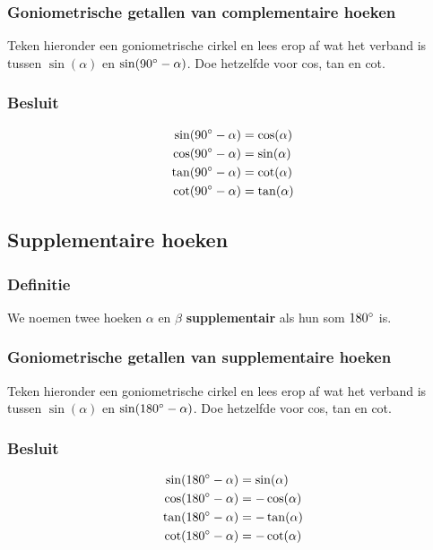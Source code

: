 \documentclass[a4paper,12pt]{article}
\begin{document}
\subsubsection*{Goniometrische getallen van complementaire hoeken}
Teken hieronder een goniometrische cirkel en lees erop af wat het verband is tussen $\sin(\alpha)$ en $\sin(90^\circ-\alpha)$. Doe hetzelfde voor cos, tan en cot.
\vspace*{7cm}

\subsubsection*{Besluit}
\begin{align*}
  \sin(90^\circ-\alpha)&=\cos(\alpha)\\
  \cos(90^\circ-\alpha)&=\sin(\alpha)\\
  \tan(90^\circ-\alpha)&=\cot(\alpha)\\
  \cot(90^\circ-\alpha)&=\tan(\alpha)
\end{align*}

\pagebreak
\subsection{Supplementaire hoeken}

\subsubsection*{Definitie}
We noemen twee hoeken $\alpha$ en $\beta$ \textbf{supplementair} als hun som $180^\circ$ is.

\subsubsection*{Goniometrische getallen van supplementaire hoeken}
Teken hieronder een goniometrische cirkel en lees erop af wat het verband is tussen $\sin(\alpha)$ en $\sin(180^\circ-\alpha)$. Doe hetzelfde voor cos, tan en cot.
\vspace*{7cm}
\subsubsection*{Besluit}
\begin{align*}
  \sin(180^\circ-\alpha)&=\sin(\alpha)\\
  \cos(180^\circ-\alpha)&=-\cos(\alpha)\\
  \tan(180^\circ-\alpha)&=-\tan(\alpha)\\
  \cot(180^\circ-\alpha)&=-\cot(\alpha)
\end{align*}
\end{document}

